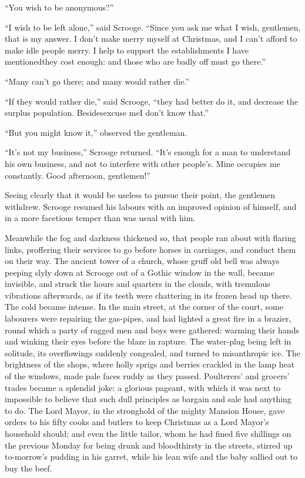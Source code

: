 \documentclass[paper=5.5in:8.5in,BCOR=10mm,twoside,DIV=15,12pt,usegeometry,openany]{scrbook} %
\begin{document}
\enquote{You wish to be anonymous?}

\enquote{I wish to be left alone,} said Scrooge. \enquote{Since you ask me what I wish, gentlemen, that is my answer. I don't make merry myself at Christmas, and I can't afford to make idle people merry. I help to support the establishments I have mentioned\textemdash they cost enough: and those who are badly off must go there.}

\enquote{Many can't go there; and many would rather die.}

\enquote{If they would rather die,} said Scrooge, \enquote{they had better do it, and decrease the surplus population. Besides\textemdash excuse me\textemdash I don't know that.}

\enquote{But you might know it,} observed the gentleman.

\enquote{It's not my business,} Scrooge returned. \enquote{It's enough for a man to understand his own business, and not to interfere with other people's. Mine occupies me constantly. Good afternoon, gentlemen!}

Seeing clearly that it would be useless to pursue their point, the gentlemen withdrew. Scrooge resumed his labours with an improved opinion of himself, and in a more facetious temper than was usual with him.

Meanwhile the fog and darkness thickened so, that people ran about with flaring links, proffering their services to go before horses in carriages, and conduct them on their way. The ancient tower of a church, whose gruff old bell was always peeping slyly down at Scrooge out of a Gothic window in the wall, became invisible, and struck the hours and quarters in the clouds, with tremulous vibrations afterwards, as if its teeth were chattering in its frozen head up there. The cold became intense. In the main street, at the corner of the court, some labourers were repairing the gas-pipes, and had lighted a great fire in a brazier, round which a party of ragged men and boys were gathered: warming their hands and winking their eyes before the blaze in rapture. The water-plug being left in solitude, its overflowings suddenly congealed, and turned to misanthropic ice. The brightness of the shops, where holly sprigs and berries crackled in the lamp heat of the windows, made pale faces ruddy as they passed. Poulterers' and grocers' trades became a splendid joke: a glorious pageant, with which it was next to impossible to believe that such dull principles as bargain and sale had anything to do. The Lord Mayor, in the stronghold of the mighty Mansion House, gave orders to his fifty cooks and butlers to keep Christmas as a Lord Mayor's household should; and even the little tailor, whom he had fined five shillings on the previous Monday for being drunk and bloodthirsty in the streets, stirred up to-morrow's pudding in his garret, while his lean wife and the baby sallied out to buy the beef.
\end{document}
